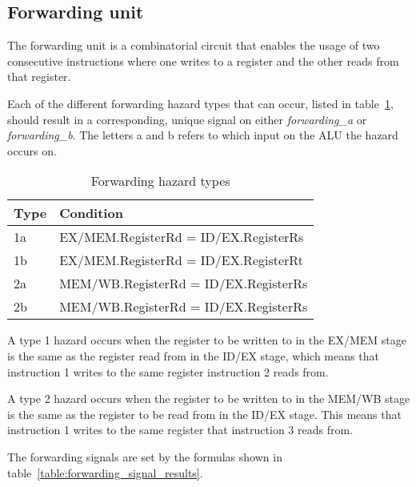 \subsection{Forwarding unit}
\label{section:forwarding_unit}

The forwarding unit is a combinatorial circuit that enables the usage of two consecutive instructions where one writes to a register and the other reads from that register.

Each of the different forwarding hazard types that can occur, listed in table~\ref{table:forwarding_hazards}, should result in a corresponding, unique signal on either \emph{forwarding\_a} or \emph{forwarding\_b}. The letters a and b refers to which input on the ALU the hazard occurs on.

\begin{table}[h]
    \centering\begin{tabular}{ l l }
        Type & Condition \\
        \hline                        
        1a & EX/MEM.RegisterRd = ID/EX.RegisterRs \\
        1b & EX/MEM.RegisterRd = ID/EX.RegisterRt \\
        2a & MEM/WB.RegisterRd = ID/EX.RegisterRs \\
        2b & MEM/WB.RegisterRd = ID/EX.RegisterRs \\
    \end{tabular}
    \caption{Forwarding hazard types}
    \label{table:forwarding_hazards}
\end{table}

A type 1 hazard occurs when the register to be written to in the EX/MEM stage is the same as the register read from in the ID/EX stage, which means that instruction 1 writes to the same register instruction 2 reads from.

A type 2 hazard occurs when the register to be written to in the MEM/WB stage is the same as the register to be read from in the ID/EX stage. This means that instruction 1 writes to the same register that instruction 3 reads from.

The forwarding signals are set by the formulas shown in table~\ref{table:forwarding_signal_results}. 

